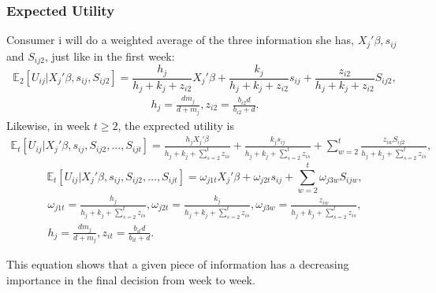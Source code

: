 	\subsubsection{Expected Utility}
	Consumer i will do a weighted average of the three information she has, $X_{j}'\beta, s_{i j}$ and $S_{i j 2}$, just like in the first week:
	\begin{equation}
		\mathbb{E}_2[U_{i j}|X_{j}'\beta, s_{i j}, S_{i j 2}]=\frac{h_{j}}{h_{j}+k_{j}+z_{i 2}} X_{j}'\beta+\frac{k_{j}}{h_{j}+k_{j}+z_{i 2}}s_{i j}+\frac{z_{i 2}}{h_{j}+k_{j}+z_{i 2}}S_{i j 2}, 
	\end{equation}
	\begin{align*}
		h_{j}=\frac{d m_{j}}{d+m_{j}}, z_{i 2}=\frac{b_{i 2}d}{b_{i 2}+d}.
	\end{align*}
	Likewise, in week $t\geqslant2$, the exprected utility is
	\begin{align*}
	\mathbb{E}_t[U_{i j}|X_{j}'\beta, s_{i j}, S_{i j 2}, ..., S_{i j t}]=\frac{h_{j}X_{j}'\beta}{h_{j}+k_{j}+\sum_{s=2}^{t}z_{i s}} +\frac{k_{j}s_{i j}}{h_{j}+k_{j}+\sum_{s=2}^{t}z_{i s}}+\sum_{w=2}^{t}\frac{z_{i w}S_{i j 2}}{h_{j}+k_{j}+\sum_{s=2}^{t}z_{i s}}, 
	\end{align*}
	\begin{equation}
	\mathbb{E}_t[U_{i j}|X_{j}'\beta, s_{i j}, S_{i j 2}, ..., S_{i j t}]=\omega_{j 1 t}X_{j}'\beta +\omega_{j 2 t}s_{i j}+\sum_{w=2}^{t}\omega_{j 3 w}S_{i j w}, 
	\end{equation}
	\begin{align*}
	\omega_{j 1 t}=\frac{h_{j}}{h_{j}+k_{j}+\sum_{s=2}^{t}z_{i s}}, 
	\omega_{j 2 t}=\frac{k_{j}}{h_{j}+k_{j}+\sum_{s=2}^{t}z_{i s}}, 
	\omega_{j 3 w}=\frac{z_{i w}}{h_{j}+k_{j}+\sum_{s=2}^{t}z_{i s}},\\
	h_{j}=\frac{d m_{j}}{d+m_{j}}, z_{i t}=\frac{b_{i t}d}{b_{i t}+d}.
	\end{align*}
	
	This equation shows that a given piece of information has a decreasing importance in the final decision from week to week.\\
	
